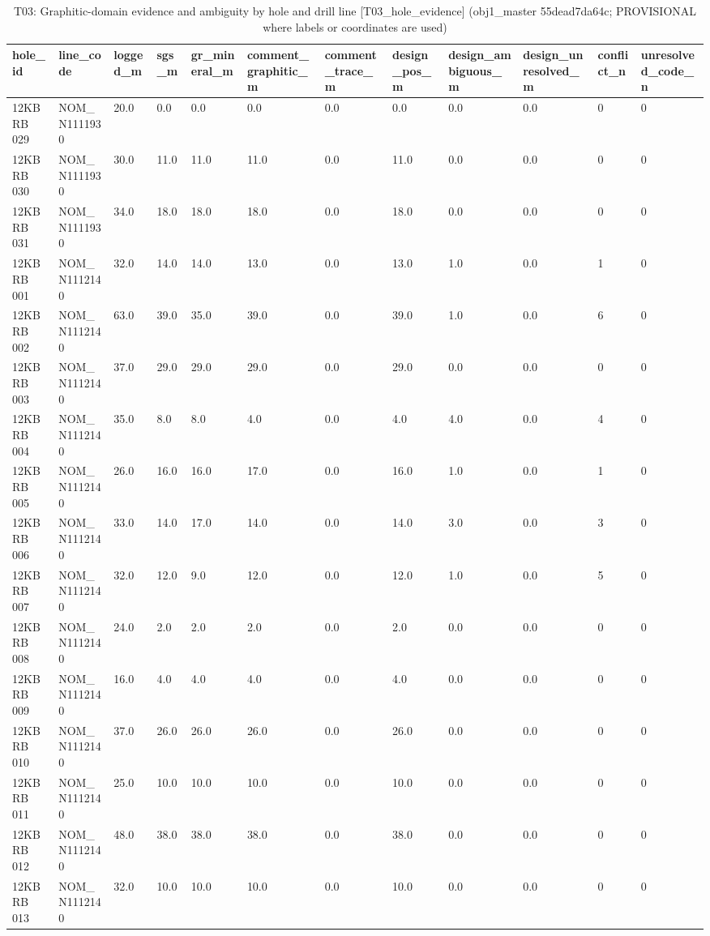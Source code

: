 \begin{table}[htbp]
\centering
\caption{T03: Graphitic-domain evidence and ambiguity by hole and drill line [T03\_hole\_evidence] (obj1\_master 55dead7da64c; PROVISIONAL where labels or coordinates are used)}
\begin{tabular}{llllllllllll}
\toprule
hole\_id & line\_code & logged\_m & sgs\_m & gr\_mineral\_m & comment\_graphitic\_m & comment\_trace\_m & design\_pos\_m & design\_ambiguous\_m & design\_unresolved\_m & conflict\_n & unresolved\_code\_n \\
\midrule
12KBRB 029 & NOM\_N1111930 & 20.0 & 0.0 & 0.0 & 0.0 & 0.0 & 0.0 & 0.0 & 0.0 & 0 & 0 \\
12KBRB 030 & NOM\_N1111930 & 30.0 & 11.0 & 11.0 & 11.0 & 0.0 & 11.0 & 0.0 & 0.0 & 0 & 0 \\
12KBRB 031 & NOM\_N1111930 & 34.0 & 18.0 & 18.0 & 18.0 & 0.0 & 18.0 & 0.0 & 0.0 & 0 & 0 \\
12KBRB 001 & NOM\_N1112140 & 32.0 & 14.0 & 14.0 & 13.0 & 0.0 & 13.0 & 1.0 & 0.0 & 1 & 0 \\
12KBRB 002 & NOM\_N1112140 & 63.0 & 39.0 & 35.0 & 39.0 & 0.0 & 39.0 & 1.0 & 0.0 & 6 & 0 \\
12KBRB 003 & NOM\_N1112140 & 37.0 & 29.0 & 29.0 & 29.0 & 0.0 & 29.0 & 0.0 & 0.0 & 0 & 0 \\
12KBRB 004 & NOM\_N1112140 & 35.0 & 8.0 & 8.0 & 4.0 & 0.0 & 4.0 & 4.0 & 0.0 & 4 & 0 \\
12KBRB 005 & NOM\_N1112140 & 26.0 & 16.0 & 16.0 & 17.0 & 0.0 & 16.0 & 1.0 & 0.0 & 1 & 0 \\
12KBRB 006 & NOM\_N1112140 & 33.0 & 14.0 & 17.0 & 14.0 & 0.0 & 14.0 & 3.0 & 0.0 & 3 & 0 \\
12KBRB 007 & NOM\_N1112140 & 32.0 & 12.0 & 9.0 & 12.0 & 0.0 & 12.0 & 1.0 & 0.0 & 5 & 0 \\
12KBRB 008 & NOM\_N1112140 & 24.0 & 2.0 & 2.0 & 2.0 & 0.0 & 2.0 & 0.0 & 0.0 & 0 & 0 \\
12KBRB 009 & NOM\_N1112140 & 16.0 & 4.0 & 4.0 & 4.0 & 0.0 & 4.0 & 0.0 & 0.0 & 0 & 0 \\
12KBRB 010 & NOM\_N1112140 & 37.0 & 26.0 & 26.0 & 26.0 & 0.0 & 26.0 & 0.0 & 0.0 & 0 & 0 \\
12KBRB 011 & NOM\_N1112140 & 25.0 & 10.0 & 10.0 & 10.0 & 0.0 & 10.0 & 0.0 & 0.0 & 0 & 0 \\
12KBRB 012 & NOM\_N1112140 & 48.0 & 38.0 & 38.0 & 38.0 & 0.0 & 38.0 & 0.0 & 0.0 & 0 & 0 \\
12KBRB 013 & NOM\_N1112140 & 32.0 & 10.0 & 10.0 & 10.0 & 0.0 & 10.0 & 0.0 & 0.0 & 0 & 0 \\

\end{tabular}
\end{table}
